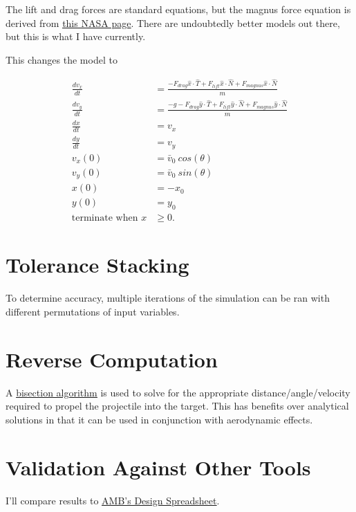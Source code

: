 \documentclass[10pt,letterpaper]{article}
\begin{document}
	The lift and drag forces are standard equations, but the magnus force equation is derived from \href{https://www.grc.nasa.gov/WWW/K-12/airplane/beach.html}{\underline{this NASA page}}. There are undoubtedly better models out there, but this is what I have currently.

	This changes the model to

	\begin{align}
		\frac{d v_x}{d t} &= \frac{- F_{drag} \hat{x} \cdot \hat{T} + F_{lift} \hat{x} \cdot \hat{N} + F_{magnus} \hat{x} \cdot \hat{N}}{m}\\
		\frac{d v_y}{d t} &= \frac{- g - F_{drag} \hat{y} \cdot \hat{T} + F_{lift} \hat{y} \cdot \hat{N} + F_{magnus} \hat{y} \cdot \hat{N}}{m} \\
		\frac{d x}{d t} &= v_x \\
		\frac{d y}{d t} &= v_y \\
		v_x(0) &= \bar{v}_0 \ cos(\theta) \\
		v_y(0) &= \bar{v}_0 \ sin(\theta) \\
		x(0) &= -x_0 \\
		y(0) &= y_0 \\
		\text{terminate when } x &\geq 0 .
	\end{align}

\section*{Tolerance Stacking}
	To determine accuracy, multiple iterations of the simulation can be ran with different permutations of input variables.

\section*{Reverse Computation}
	A \href{https://en.wikipedia.org/wiki/Bisection_method}{\underline{bisection algorithm}} is used to solve for the appropriate distance/angle/velocity required to propel the projectile into the target. This has benefits over analytical solutions in that it can be used in conjunction with aerodynamic effects.

\section*{Validation Against Other Tools}

	I'll compare results to \href{https://www.chiefdelphi.com/t/amb-design-spreadsheet-v5/383857}{\underline{AMB's Design Spreadsheet}}.
\end{document}
